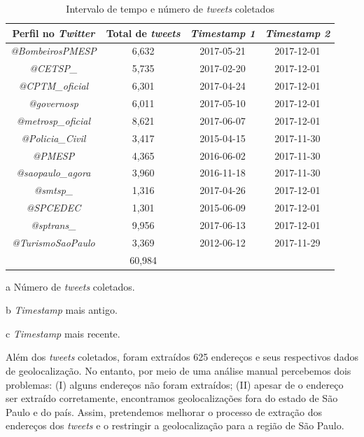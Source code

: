 \documentclass[
	12pt,				%
	oneside,			%
	a4paper,			%
	english,			%
	brazil				%
	]{abntex2ppgsi}
\begin{document}
{{\begin{table}[!htb]
\centering
\caption{Intervalo de tempo e número de \textit{tweets} coletados}
	\label{tab:tweetsCollected}
\begin{threeparttable}
\begin{tabular}{c|c|c|c}
\toprule
\textbf {Perfil no \textit{Twitter}} &\textbf{Total de \textit{tweets}\tnote{a}}  &\textbf{ \textit{Timestamp 1\tnote{b}}} & \textbf{\textit{Timestamp 2\tnote{c}}} \\ 
\midrule
\textit{@BombeirosPMESP} & 6,632 & 2017-05-21 & 2017-12-01 \\
\hline
\textit{@CETSP\_} & 5,735 & 2017-02-20  & 2017-12-01 \\
\hline
\textit{@CPTM\_oficial} & 6,301 & 2017-04-24 & 2017-12-01 \\
\hline
\textit{@governosp}  & 6,011 & 2017-05-10 & 2017-12-01 \\
\hline
\textit{@metrosp\_oficial} & 8,621 & 2017-06-07 & 2017-12-01 \\
\hline
\textit{@Policia\_Civil}  & 3,417 & 2015-04-15 & 2017-11-30 \\
\hline
\textit{@PMESP}  & 4,365 & 2016-06-02 & 2017-11-30 \\
\hline
\textit{@saopaulo\_agora}  & 3,960 & 2016-11-18 & 2017-11-30 \\
\hline
\textit{@smtsp\_} & 1,316 & 2017-04-26 & 2017-12-01 \\
\hline
\textit{@SPCEDEC} & 1,301 & 2015-06-09 & 2017-12-01 \\
\hline
\textit{@sptrans\_} & 9,956 & 2017-06-13 & 2017-12-01 \\
\hline
\textit{@TurismoSaoPaulo} & 3,369 & 2012-06-12 & 2017-11-29 \\
\midrule
\textbf {} & 60,984 & {} & {} \\
\bottomrule
\end{tabular}
\begin{tablenotes}
            \item[a] Número de \textit{tweets} coletados.
            \item[b] \textit{Timestamp} mais antigo.
            \item[c] \textit{Timestamp} mais recente.
        \end{tablenotes}
\end{threeparttable}
\end{table}

Além dos \textit{tweets} coletados, foram extraídos 625 endereços e seus respectivos dados de geolocalização. No entanto, por meio de uma análise manual percebemos dois problemas: (I) alguns endereços não foram extraídos; (II) apesar de o endereço ser extraído corretamente, encontramos geolocalizações fora do estado de São Paulo e do país. Assim, pretendemos melhorar o processo de extração dos endereços dos \textit{tweets} e o restringir a geolocalização para a região de São Paulo. 

}}
\end{document}

